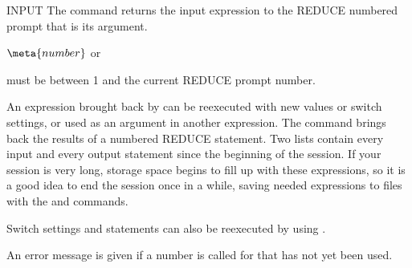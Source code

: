 \begin{Command}{INPUT}
The  command returns the input expression to the REDUCE numbered
prompt that is its argument.
\begin{Syntax}
\(\meta{number}\) or  

\end{Syntax}

 must be between 1 and the current REDUCE prompt number.

\begin{Comments}
An expression brought back by  can be reexecuted with new
values or switch settings, or used as an argument in another expression.
The command  brings back the results of a numbered REDUCE
statement.  Two lists contain every input and every output statement since
the beginning of the session.  If your session is very long, storage space
begins to fill up with these expressions, so it is a good idea to end the
session once in a while, saving needed expressions to files with the
 and  commands.

Switch settings and  statements can also be reexecuted by using
.

An error message is given if a number is called for that has not yet been used.
\end{Comments}
\end{Command}


